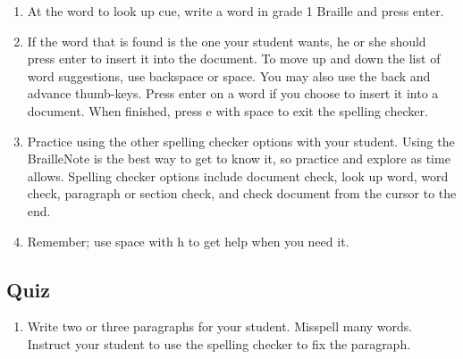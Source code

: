 \documentclass[10pt,letterpaper,twoside]{report}
\begin{document}
{{{\begin{enumerate}
	\item At the word to look up cue, write a word in grade 1 Braille and press enter.
	\item If the word that is found is the one your student wants, he or she should press enter to insert it into the document.  To move up and down the list of word suggestions, use backspace or space.  You may also use the back and advance thumb-keys.  Press enter on a word if you choose to insert it into a document.  When finished, press e with space to exit the spelling checker.
	\item Practice using the other spelling checker options with your student.  Using the BrailleNote is the best way to get to know it, so practice and explore as time allows.  Spelling checker options include document check, look up word, word check, paragraph or section check, and check document from the cursor to the end.
	\item Remember; use space with h to get help when you need it.
\end{enumerate}
\clearpage
\subsection{Quiz}
\begin{enumerate}
	\item Write two or three paragraphs for your student.  Misspell many words.  Instruct your student to use the spelling checker to fix the paragraph.
\end{enumerate}

}}}
\end{document}

